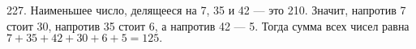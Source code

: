 227. Наименьшее число, делящееся на 7, 35 и 42 --- это 210. Значит, напротив 7 стоит 30, напротив 35 стоит 6, а напротив 42 --- 5. Тогда сумма всех чисел равна $7+35+42+30+6+5=125.$\\
